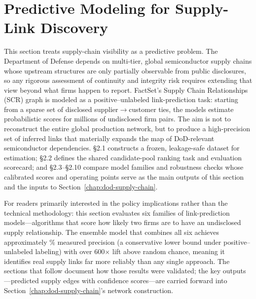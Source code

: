 \chapter{Predictive Modeling for Supply-Link Discovery}
\label{chap:link-prediction}


This section treats supply-chain visibility as a predictive problem. The Department of Defense depends on multi-tier, global semiconductor supply chains whose upstream structures are only partially observable from public disclosures, so any rigorous assessment of continuity and integrity risk requires extending that view beyond what firms happen to report. FactSet's Supply Chain Relationships (SCR) graph is modeled as a positive--unlabeled link-prediction task: starting from a sparse set of disclosed supplier$\rightarrow$customer ties, the models estimate probabilistic scores for millions of undisclosed firm pairs. The aim is not to reconstruct the entire global production network, but to produce a high-precision set of inferred links that materially expands the map of DoD-relevant semiconductor dependencies. \S2.1 constructs a frozen, leakage-safe dataset for estimation; \S2.2 defines the shared candidate-pool ranking task and evaluation scorecard; and \S2.3--\S2.10 compare model families and robustness checks whose calibrated scores and operating points serve as the main outputs of this section and the inputs to Section~\ref{chap:dod-supply-chain}.

For readers primarily interested in the policy implications rather than the technical methodology: this section evaluates six families of link-prediction models---algorithms that score how likely two firms are to have an undisclosed supply relationship. The ensemble model that combines all six achieves approximately \CorePrecision\% measured precision (a conservative lower bound under positive--unlabeled labeling) with over 600$\times$ lift above random chance, meaning it identifies real supply links far more reliably than any single approach. The sections that follow document how those results were validated; the key outputs---predicted supply edges with confidence scores---are carried forward into Section~\ref{chap:dod-supply-chain}'s network construction.

